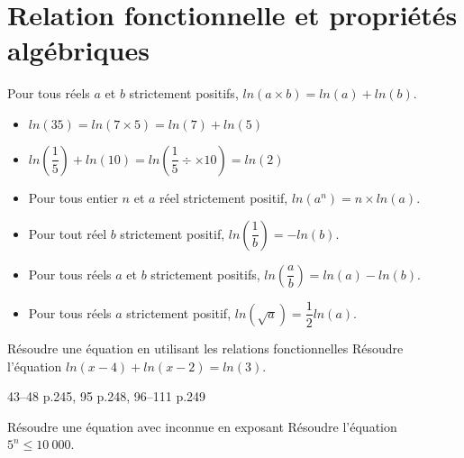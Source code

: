 \documentclass[a4paper]{article}
\begin{document}
\pagebreak

\section{Relation fonctionnelle et propriétés algébriques}
\begin{theoreme}{}{}
  Pour tous réels $a$ et $b$ strictement positifs, $ln(a\times b)=ln(a)+ln(b)$.
\end{theoreme}
\begin{example}{}{}

\begin{itemize}[label=\textbullet]
  \item $ln(35)=ln(7\times5)=ln(7)+ln(5)$
  \item $ln(\dfrac{1}{5})+ln(10)=ln(\dfrac{1}{5}÷\times 10 )=ln(2)$
\end{itemize}
\end{example}


\begin{propriete}{}{}
\begin{itemize}[label=\textbullet]
  \item Pour tous entier $n$ et $a$ réel strictement positif, $ln(a^n)=n\times ln(a)$.
  \item Pour tout réel $b$ strictement positif, $ln\left(\dfrac{1}{b}\right)=-ln(b)$.
  \item Pour tous réels $a$ et $b$ strictement positifs, $ln\left(\dfrac{a}{b}\right)=ln(a)-ln(b)$.
  \item Pour tous réels $a$ strictement positif, $ln\left(\sqrt{a}\right)=\dfrac{1}{2}ln(a)$. 
\end{itemize}
\end{propriete}

\begin{methode}{Résoudre une équation en utilisant les relations fonctionnelles}{}
  Résoudre l'équation  $ln(x-4)+ln(x-2)=ln(3)$.

  \vspace{4cm}
  

  \end{methode}

\begin{exercices}{}{}
43--48 p.245, 95 p.248, 96--111 p.249
\end{exercices}
\begin{methode}{Résoudre une équation avec inconnue en exposant}{}
  Résoudre l'équation  $5^n \leqslant 10~000$.

  \vspace{4cm}
  

  \end{methode}
\end{document}
